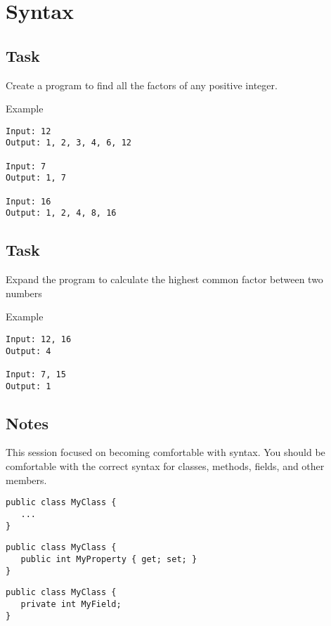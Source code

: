 \documentclass{article}
\begin{document}
\section{Syntax}

\subsection{Task}
Create a program to find all the factors of any positive integer.

\begin{titleBox}[colback=white]{Example}
\begin{verbatim}
Input: 12
Output: 1, 2, 3, 4, 6, 12

Input: 7
Output: 1, 7

Input: 16
Output: 1, 2, 4, 8, 16
\end{verbatim}
\end{titleBox}

\subsection{Task}
Expand the program to calculate the highest common factor between two numbers

\begin{titleBox}[colback=white]{Example}
\begin{verbatim}
Input: 12, 16
Output: 4

Input: 7, 15
Output: 1
\end{verbatim}
\end{titleBox}

\subsection{Notes}
This session focused on becoming comfortable with syntax. You should be comfortable with the correct syntax for classes, methods, fields, and other members.

\begin{lstlisting}[language={[Sharp]C}, title={Creating a class}, label={Script}]
public class MyClass {
   ...
}
\end{lstlisting}

\begin{lstlisting}[language={[Sharp]C}, title={Creating properties}, label={Script}]
public class MyClass {
   public int MyProperty { get; set; } 
}
\end{lstlisting}

\begin{lstlisting}[language={[Sharp]C}, title={Creating fields}, label={Script}]
public class MyClass {
   private int MyField; 
}
\end{lstlisting}
\end{document}
